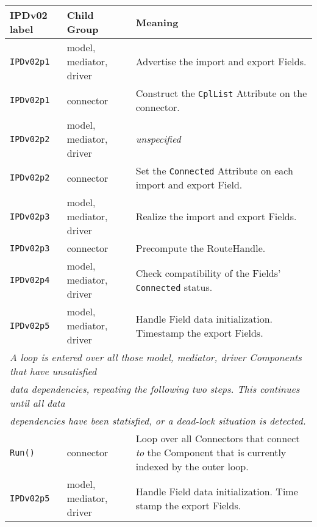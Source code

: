 \vspace*{3ex}
\begin{tabular}[h]{|p{35mm}|p{4cm}|p{6cm}|}
     \hline\hline
     {\bf IPDv02 label} & {\bf Child Group} & {\bf Meaning}\\
     \hline\hline
     {\tt IPDv02p1} & model, mediator, driver & Advertise the import and export Fields.\\ \hline
     {\tt IPDv02p1} & connector               & Construct the {\tt CplList} Attribute on the connector.\\ \hline
     {\tt IPDv02p2} & model, mediator, driver & {\em unspecified}\\ \hline
     {\tt IPDv02p2} & connector               & Set the {\tt Connected} Attribute on each import and export Field.\\ \hline
     {\tt IPDv02p3} & model, mediator, driver & Realize the import and export Fields.\\ \hline
     {\tt IPDv02p3} & connector               & Precompute the RouteHandle.\\ \hline
     {\tt IPDv02p4} & model, mediator, driver & Check compatibility of the Fields' {\tt Connected} status.\\ \hline
     {\tt IPDv02p5} & model, mediator, driver & Handle Field data initialization. Timestamp the export Fields.\\ \hline
     \multicolumn{3}{|l|}{\it A loop is entered over all those model, mediator, driver Components that have unsatisfied}\\
     \multicolumn{3}{|l|}{\it data dependencies, repeating the following two steps. This continues until all data}\\
     \multicolumn{3}{|l|}{\it dependencies have been statisfied, or a dead-lock situation is detected.}\\ \hline
     {\tt Run()}    & connector               & Loop over all Connectors that connect {\it to} the Component that is currently indexed by the outer loop.\\ \hline
     {\tt IPDv02p5} & model, mediator, driver & Handle Field data initialization. Time stamp the export Fields.\\
     \hline\hline
\end{tabular}\newline
